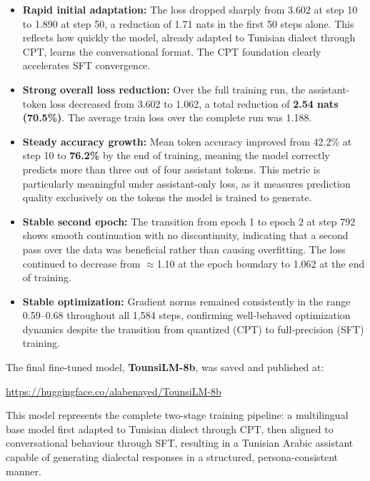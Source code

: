 \documentclass[12pt,a4paper]{report}
\begin{document}
\begin{itemize}
    \item \textbf{Rapid initial adaptation:} The loss dropped sharply from
    3.602 at step 10 to 1.890 at step 50, a reduction of 1.71 nats in the
    first 50 steps alone. This reflects how quickly the model, already adapted
    to Tunisian dialect through CPT, learns the conversational format. The CPT
    foundation clearly accelerates SFT convergence.

    \item \textbf{Strong overall loss reduction:} Over the full training run,
    the assistant-token loss decreased from 3.602 to 1.062, a total reduction
    of \textbf{2.54 nats (70.5\%)}. The average train loss over the complete
    run was 1.188.

    \item \textbf{Steady accuracy growth:} Mean token accuracy improved from
    42.2\% at step 10 to \textbf{76.2\%} by the end of training, meaning the
    model correctly predicts more than three out of four assistant tokens.
    This metric is particularly meaningful under assistant-only loss, as it
    measures prediction quality exclusively on the tokens the model is trained
    to generate.

    \item \textbf{Stable second epoch:} The transition from epoch 1 to epoch 2
    at step 792 shows smooth continuation with no discontinuity, indicating
    that a second pass over the data was beneficial rather than causing
    overfitting. The loss continued to decrease from $\approx$1.10 at the
    epoch boundary to 1.062 at the end of training.

    \item \textbf{Stable optimization:} Gradient norms remained consistently
    in the range 0.59--0.68 throughout all 1,584 steps, confirming well-behaved
    optimization dynamics despite the transition from quantized (CPT) to
    full-precision (SFT) training.
\end{itemize}

The final fine-tuned model, \textbf{TounsiLM-8b}, was saved and published at:
\begin{center}
\url{https://huggingface.co/alabenayed/TounsiLM-8b}
\end{center}

This model represents the complete two-stage training pipeline: a multilingual
base model first adapted to Tunisian dialect through CPT, then aligned to
conversational behaviour through SFT, resulting in a Tunisian Arabic assistant
capable of generating dialectal responses in a structured, persona-consistent
manner.
\end{document}
